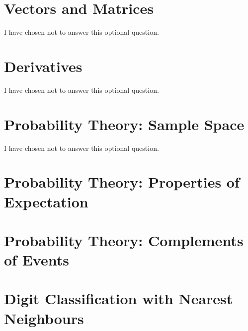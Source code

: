 \documentclass[12pt]{article}
\begin{document}
\section{Vectors and Matrices}

I have chosen not to answer this optional question.

\section{Derivatives}

I have chosen not to answer this optional question.

\section{Probability Theory: Sample Space}

I have chosen not to answer this optional question.

\section{Probability Theory: Properties of Expectation}



\section{Probability Theory: Complements of Events}



\section{Digit Classification with Nearest Neighbours}


\end{document}
